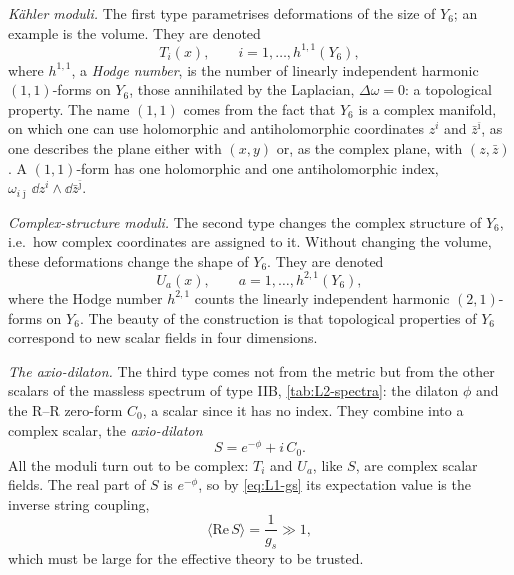 \emph{Kähler moduli.} The first type parametrises deformations of the size of $Y_6$; an example is the volume. They are denoted
\begin{equation}
  T_i(x) ,\qquad i = 1,\dots,h^{1,1}(Y_6) ,
  \label{eq:L2-T}
\end{equation}
where $h^{1,1}$, a \emph{Hodge number}, is the number of linearly independent harmonic $(1,1)$-forms on $Y_6$, those annihilated by the Laplacian, $\Delta\omega = 0$: a topological property. The name $(1,1)$ comes from the fact that $Y_6$ is a complex manifold, on which one can use holomorphic and antiholomorphic coordinates $z^i$ and $\bar z^{\bar\imath}$, as one describes the plane either with $(x,y)$ or, as the complex plane, with $(z,\bar z)$. A $(1,1)$-form has one holomorphic and one antiholomorphic index, $\omega_{i\bar\jmath}\,\dd z^i\wedge\dd\bar z^{\bar\jmath}$.

\emph{Complex-structure moduli.} The second type changes the complex structure of $Y_6$, i.e.\ how complex coordinates are assigned to it. Without changing the volume, these deformations change the shape of $Y_6$. They are denoted
\begin{equation}
  U_a(x) ,\qquad a = 1,\dots,h^{2,1}(Y_6) ,
  \label{eq:L2-U}
\end{equation}
where the Hodge number $h^{2,1}$ counts the linearly independent harmonic $(2,1)$-forms on $Y_6$. The beauty of the construction is that topological properties of $Y_6$ correspond to new scalar fields in four dimensions.

\emph{The axio-dilaton.} The third type comes not from the metric but from the other scalars of the massless spectrum of type IIB, \cref{tab:L2-spectra}: the dilaton $\phi$ and the R--R zero-form $C_0$, a scalar since it has no index. They combine into a complex scalar, the \emph{axio-dilaton}
\begin{equation}
  S = e^{-\phi} + i\,C_0 .
  \label{eq:L2-S}
\end{equation}
All the moduli turn out to be complex: $T_i$ and $U_a$, like $S$, are complex scalar fields. The real part of $S$ is $e^{-\phi}$, so by \cref{eq:L1-gs} its expectation value is the inverse string coupling,
\begin{equation}
  \langle\mathrm{Re}\,S\rangle = \frac{1}{g_s} \gg 1 ,
  \label{eq:L2-ReS}
\end{equation}
which must be large for the effective theory to be trusted.


